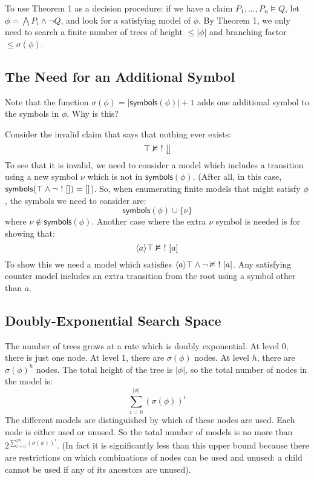To use Theorem 1 as a decision procedure: if we have a claim $P_1, ..., P_n \models Q$,  let $ \phi = \bigwedge P_i \land \neg Q$, and look for a satisfying model of $\phi$. By Theorem 1, we only need to search a finite number of trees of height $\leq |\phi|$ and branching factor $\leq \sigma(\phi)$.

\subsection{The Need for an Additional Symbol}
Note that the function $\sigma(\phi) = |\mathsf{symbols}(\phi)| + 1$ adds one additional symbol to the symbols in $\phi$. Why is this?

Consider the invalid claim that says that nothing ever exists:
\[
\top \nvDash \ ! \  []
\]
To see that it is invalid, we need to consider a model which includes a transition using a new symbol $\nu$ which is not in $\mathsf{symbols}(\phi)$. (After all, in this case, $\mathsf{symbols}(\top \land \neg  \ ! \  []) = []$). 
So, when enumerating finite models that might satisfy $\phi$, the symbols we need to consider are:
\[
\mathsf{symbols}(\phi) \cup \{\nu\}
\]
where $\nu \notin \mathsf{symbols}(\phi)$. Another case where the extra $\nu$ symbol is needed is for showing that:
\[
\langle a \rangle \top \nvDash \ ! \  [a]
\]
To show this we need a model which satisfies $\langle a \rangle \top \land \neg \nvDash \ ! \  [a]$.
Any satisfying counter model includes an extra transition from the root using a symbol other than $a$.

\subsection{Doubly-Exponential Search Space}
The number of trees grows at a rate which is doubly exponential.
At level $0$, there is just one node.
At level $1$, there are $\sigma(\phi)$ nodes.
At level $h$, there are $\sigma(\phi)^h$ nodes.
The total height of the tree is $|\phi|$, so the total number of nodes in the model is:
\[
\sum_{i=0}^{|\phi|} (\sigma(\phi))^i
\]
The different models are distinguished by which of these nodes are used. 
Each node is either used or unused.
So the total number of models is no more than $2 ^ {\sum_{i=0}^{|\phi|} (\sigma(\phi))^i}$.
(In fact it is significantly less than this upper bound because there are restrictions on which combinations of nodes can be used and unused: a child cannot be used if any of its ancestors are unused).

